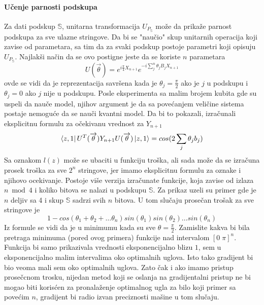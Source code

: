 \documentclass[12pt, letterpaper, oneside]{article}
\begin{document}
\paragraph{Učenje parnosti podskupa}
Za dati podskup $\mathbb{S}$, unitarna transformacija $U_{P_\mathbb{S}}$ može da prikaže parnost podskupa za sve ulazne stringove.
Da bi se "naučio" skup unitarnih operacija koji zavise od parametara, sa tim da za svaki podskup postoje parametri koji opisuju $U_{P_\mathbb{S}}$.
Najlakši način da se ovo postigne jeste da se koriste $n$ parametara
\[
    U(\overrightarrow{\theta}) = e^{i\frac{\pi}{4}X_{n+1}}e^{-i\sum_j^n \theta_jB_jX_{n+1}}
\]
ovde se vidi da je reprezentacija savršena kada je $\theta_j = \frac{\pi}{2}$ ako je $j$ u podskupu i$\theta_j = 0$ ako $j$ nije u podskupu.
Posle eksperimenta sa malim brojem kubita gde su uspeli da nauče model, njihov argument je da sa povećanjem veličine sistema postaje nemoguće da se nauči kvantni model.
Da bi to pokazali, izračunali eksplicitnu formulu za očekivanu vrednost za $Y_{n+1}$
\[
    \bra{z,1}U^T(\overrightarrow{\theta})Y_{n+1}U(\overrightarrow{\theta})\Ket{z,1} = cos(2\sum_j\theta_jb_j)
\]
Sa oznakom $l(z)$ može se ubaciti u funkciju troška, ali sada može da se izračuna prosek
troška za sve $2^n$ stringove, jer imamo eksplicitnu formulu za oznake i njihovo ocekivanje.
Postoje više verzija izračunate funkcije, koja zavise od izlaza $n \bmod 4$ i koliko bitova se nalazi u podskupu $\mathbb{S}$.
Za prikaz uzeli su primer gde je $n$ deljiv sa 4 i skup $\mathbb{S}$ sadrzi svih $n$ bitova.
U tom slučaju prosečan trošak za sve stringove je 
\[
    1 - cos(\theta_1 + \theta_2 + \dots \theta_n)sin(\theta_1)sin(\theta_2) \dots sin(\theta_n)
\]
Iz formule se vidi da je u minimumu kada su sve $\theta=\frac{\pi}{2}$. Zamislite kakva bi bila pretraga minimuma (pored ovog primera) funkcije
nad intervalom $[0\;\pi]^n$. Funkcija bi samo prikazivala vrednosti eksponencijalno blizu $1$, sem u eksponencijalno malim intervalima oko optimalnih uglova.
Isto tako gradijent bi bio veoma mali sem oko optimalnih uglova. Zato čak i ako imamo pristup prosečcnom trosku, nijedan metod koji se oslanja na gradijentalni pristup
ne bi mogao biti korisćen za pronalaženje optimalnog ugla za bilo koji primer sa povećim $n$, gradijent bi radio izvan preciznosti mašine u tom slučaju.
\end{document}
